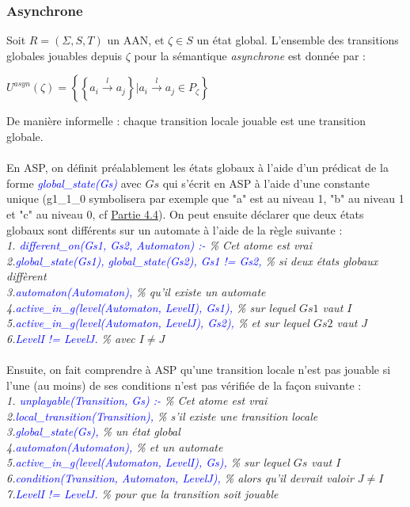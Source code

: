\documentclass[12pt,a4paper]{article}
\begin{document}
\subsubsection{Asynchrone}
Soit $R = (\Sigma,S,T)$ un AAN, et $\zeta\in S$ un état global. L'ensemble des transitions globales jouables depuis $\zeta$ pour la sémantique \emph{asynchrone} est donnée par :
\begin{center}
	$U^{asyn}(\zeta)=\left\{\left\{a_i\xrightarrow{l} a_j\right\}|a_i\xrightarrow{l} a_j\in P_{\zeta}\right\}$
\end{center}
De manière informelle : chaque transition locale jouable est une transition globale.\\ \\
En ASP, on définit préalablement les états globaux à l'aide d'un prédicat de la forme \emph{\textcolor{blue}{global\_state(Gs)}} avec $Gs$ qui s'écrit en ASP à l'aide d'une constante unique (g1\_1\_0 symbolisera par exemple que "a" 
est au niveau 1, "b" au niveau 1 et "c" au niveau 0, cf \hyperlink{partie4.4}{Partie 4.4}). On peut ensuite déclarer que deux états globaux sont différents sur un automate à l'aide de la règle suivante :\\
\emph{
1. \textcolor{blue}{different\_on(Gs1, Gs2, Automaton) :-} \% Cet atome est vrai\\
2.\qquad \textcolor{blue}{global\_state(Gs1), global\_state(Gs2), Gs1 != Gs2,} \% si deux états globaux diffèrent\\
3.\qquad \textcolor{blue}{automaton(Automaton),} \% qu'il existe un automate\\
4.\qquad \textcolor{blue}{active\_in\_g(level(Automaton, LevelI), Gs1),} \% sur lequel $Gs1$ vaut $I$\\
5.\qquad \textcolor{blue}{active\_in\_g(level(Automaton, LevelJ), Gs2),} \% et sur lequel $Gs2$ vaut $J$\\
6.\qquad \textcolor{blue}{LevelI != LevelJ.} \% avec $I \neq J$\\ \\
}
Ensuite, on fait comprendre à ASP qu'une transition locale n'est pas jouable si l'une (au moins) de ses conditions n'est pas vérifiée de la façon suivante :\\
\emph{
1. \textcolor{blue}{unplayable(Transition, Gs) :-} \% Cet atome est vrai\\
2.\qquad \textcolor{blue}{local\_transition(Transition),} \% s'il existe une transition locale\\
3.\qquad \textcolor{blue}{global\_state(Gs),} \% un état global\\
4.\qquad \textcolor{blue}{automaton(Automaton),} \% et un automate\\
5.\qquad \textcolor{blue}{active\_in\_g(level(Automaton, LevelI), Gs),} \% sur lequel $Gs$ vaut $I$\\
6.\qquad \textcolor{blue}{condition(Transition, Automaton, LevelJ),} \% alors qu'il devrait valoir $J\neq I$\\
7.\qquad \textcolor{blue}{LevelI != LevelJ.} \% pour que la transition soit jouable\\ \\
}
\end{document}
